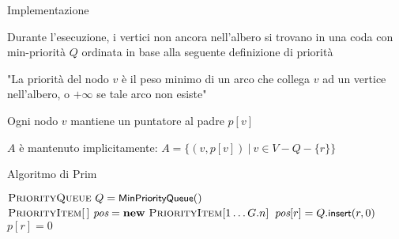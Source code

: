 \begin{frame}{Implementazione}

\vspace{-9pt}
\begin{myboxtitle}
\BI
\item Durante l'esecuzione, i vertici non ancora nell'albero si trovano in una 
coda con min-priorità $Q$ ordinata in base alla seguente definizione di priorità
\item "La priorità del nodo $v$ è il peso minimo di un arco che collega $v$ ad
un vertice nell'albero, o $+\infty$ se tale arco non esiste"
\EI
\end{myboxtitle}

\begin{myboxtitle}
\BI
\item Ogni nodo $v$ mantiene un puntatore al padre $p[v]$
\item $A$ è mantenuto implicitamente: $A = \{ (v, p[v]) ~|~ v \in V - Q - \{ r \} \}$
\EI
\end{myboxtitle}

\end{frame}



\begin{frame}{Algoritmo di Prim}

\vspace{-12pt}
\begin{Procedure}
\caption[A]{\prim($\Graph\ G,\ \Node\ r, \INTARRAY\ p$)}

$\textsc{PriorityQueue}\ Q = \textsf{{\small MinPriorityQueue}}()$\;
$\PriorityItem[\,]\ \Pos = \NEW\ \PriorityItem[1 \mldots G.n]$\;
$\textit{pos}[r] = Q.\textsf{{\small insert}}(r, 0)$\;
$p[r] = 0$\;
\end{Procedure}
\end{frame}

